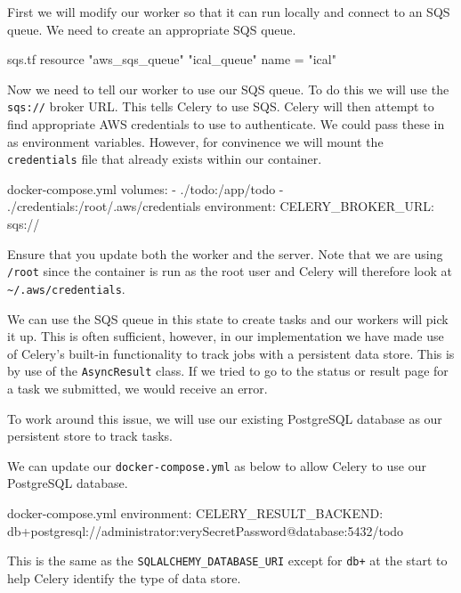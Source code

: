 \documentclass{csse4400}
\begin{document}
First we will modify our worker so that it can run locally and connect to an SQS queue.
We need to create an appropriate SQS queue.

\begin{code}[language=terraform,numbers=none]{sqs.tf}
resource "aws_sqs_queue" "ical_queue" {
    name = "ical"
}
\end{code}


Now we need to tell our worker to use our SQS queue.
To do this we will use the \texttt{sqs://} broker URL.
This tells Celery to use SQS.
Celery will then attempt to find appropriate AWS credentials to use to authenticate.
We could pass these in as environment variables.
However, for convinence we will mount the \texttt{credentials} file that already exists within our container.

\begin{code}[numbers=none]{docker-compose.yml}
volumes:
  - ./todo:/app/todo
  - ./credentials:/root/.aws/credentials
environment:
  CELERY_BROKER_URL: sqs://
\end{code}

Ensure that you update both the worker and the server.
Note that we are using \texttt{/root} since the container is run as the root user and Celery will therefore look at \texttt{\textasciitilde/.aws/credentials}.

We can use the SQS queue in this state to create tasks and our workers will pick it up.
This is often sufficient,
however, in our implementation we have made use of Celery's built-in functionality to track jobs with a persistent data store.
This is by use of the \texttt{AsyncResult} class.
If we tried to go to the status or result page for a task we submitted, we would receive an error.

To work around this issue,
we will use our existing PostgreSQL database as our persistent store to track tasks.

We can update our \texttt{docker-compose.yml} as below to allow Celery to use our PostgreSQL database.

\begin{code}[numbers=none]{docker-compose.yml}
environment:
    CELERY_RESULT_BACKEND: db+postgresql://administrator:verySecretPassword@database:5432/todo
\end{code}

This is the same as the \texttt{SQLALCHEMY\_DATABASE\_URI} except for \texttt{db+} at the start to help Celery identify the type of data store.
\end{document}
